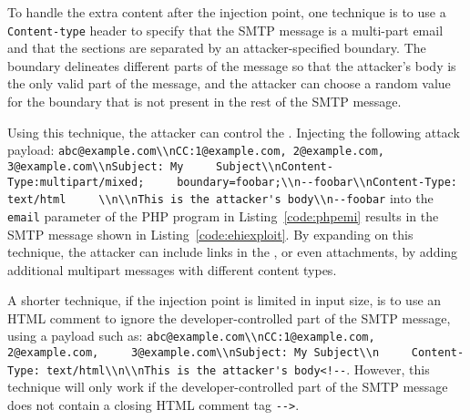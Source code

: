 To handle the extra content after the injection point, one technique
is to use a \texttt{Content-type} header to specify that the SMTP
message is a multi-part email and that the sections are separated by
an attacker-specified boundary. The boundary delineates different
parts of the message so that the attacker's body is the only valid
part of the message, and the attacker can choose a random value for
the boundary that is not present in the rest of the SMTP message.

Using this technique, the attacker can control the \email.
Injecting the following attack payload:
\texttt{\lstinline{abc@example.com\\nCC:1@example.com, 2@example.com,
    3@example.com\\nSubject: My
    Subject\\nContent-Type:multipart/mixed;
    boundary=foobar;\\n--foobar\\nContent-Type: text/html
    \\n\\nThis is the attacker's body\\n--foobar}} into the \texttt{email} parameter
of the PHP program in Listing~\ref{code:phpemi} results in
the SMTP message shown in Listing~\ref{code:ehiexploit}.
By expanding on this technique, the attacker can include links in the
\email, or even attachments, by adding additional multipart messages
with different content types.

A shorter technique, if the injection point is limited in input
size, is to use an HTML comment to ignore the developer-controlled
part of the SMTP message, using a payload such as:
\texttt{\lstinline{abc@example.com\\nCC:1@example.com, 2@example.com,
    3@example.com\\nSubject: My Subject\\n
    Content-Type: text/html\\n\\nThis is the attacker's body<!--}}. However, this
technique will only work if the developer-controlled part of the SMTP
message does not contain a closing HTML comment tag
\texttt{\lstinline{-->}}.

